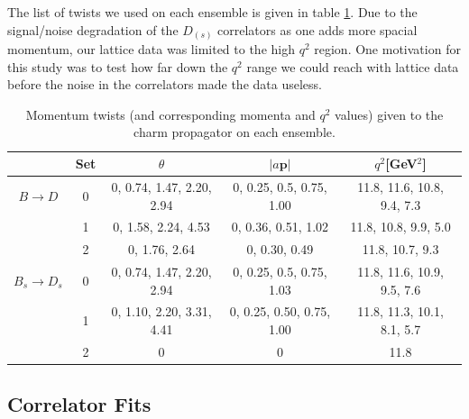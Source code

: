 The list of twists we used on each ensemble is given in table \ref{tab:nrqcd_twists}. Due to the signal/noise degradation of the $D_{(s)}$ correlators as one adds more spacial momentum, our lattice data was limited to the high $q^2$ region. One motivation for this study was to test how far down the $q^2$ range we could reach with lattice data before the noise in the correlators made the data useless.

\begin{table}[htb!]
  \vspace{10pt}
  \hspace{-20pt}
 \begin{tabular}{c c c c c}
 \hline
 & Set & $\theta$ & $|a{\textbf{p}}|$ & $q^2$[GeV$^2$] \\ [0.5ex] 
 \hline
 $B\to D$ & 0 & 0, 0.74, 1.47, 2.20, 2.94 & 0, 0.25, 0.5, 0.75, 1.00 & 11.8, 11.6, 10.8, 9.4, 7.3 \\ [1ex]
 & 1 & 0, 1.58, 2.24, 4.53 & 0, 0.36, 0.51, 1.02 & 11.8, 10.8, 9.9, 5.0  \\ [1ex]
 & 2 & 0, 1.76, 2.64 & 0, 0.30, 0.49 & 11.8, 10.7, 9.3 \\ [1ex]
 \hline
 $B_s\to D_s$ & 0 & 0, 0.74, 1.47, 2.20, 2.94 & 0, 0.25, 0.5, 0.75, 1.03 & 11.8, 11.6, 10.9, 9.5, 7.6 \\ [1ex]
 & 1 & 0, 1.10, 2.20, 3.31, 4.41 & 0, 0.25, 0.50, 0.75, 1.00 & 11.8, 11.3, 10.1, 8.1, 5.7 \\ [1ex]
 & 2 & 0 & 0 & 11.8\\  [1ex]
 \hline
\end{tabular}
 \caption{Momentum twists (and corresponding momenta and $q^2$ values) given to the charm propagator on each ensemble. \label{tab:nrqcd_twists} }
\end{table}

\subsection{Correlator Fits}

